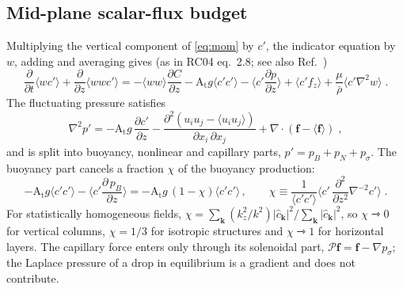 \documentclass[11pt]{article}
\numberwithin{equation}{section}
\newcommand{\avg}[1]{\langle #1\rangle}
\newcommand{\At}{\mathrm{A_t}}
\newcommand{\pd}[2]{\frac{\partial #1}{\partial #2}}
\begin{document}
\subsection{Mid-plane scalar-flux budget}\label{sec:rc:flux}
Multiplying the vertical component of \eqref{eq:mom} by $c'$, the indicator equation by $w$, adding and averaging gives (as in RC04 eq.~2.8; see also Ref.~\cite{Pope_book})
\begin{equation}\label{eq:flux_eq}
\pd{}{t} \avg{w c'} + \pd{}{z} \avg{w w c'} = -\avg{w w} \pd{C}{z} - \At g \avg{c' c'} - \Big\langle c' \pd{p}{z}\Big\rangle
+ \avg{c' f_z} + \frac{\mu}{\bar\rho} \avg{c' \nabla^2 w} \;.
\end{equation}
The fluctuating pressure satisfies
\begin{equation}\label{eq:poisson}
\nabla^2 p' = -\At g \, \pd{c'}{z} - \frac{\partial^2(u_i u_j - \avg{u_i u_j})}{\partial x_i \, \partial x_j}
+ \nabla \cdot (\mathbf f - \avg{\mathbf f}) \;,
\end{equation}
and is split into buoyancy, nonlinear and capillary parts, $p' = p_B + p_N + p_\sigma$. The buoyancy part cancels a fraction $\chi$ of the buoyancy production:
\begin{equation}\label{eq:chi}
- \At g \avg{c' c'} - \Big\langle c' \pd{\, p_B}{z}\Big\rangle = -\At g \,(1 - \chi) \avg{c' c'} \, , \qquad
\chi \equiv \frac{1}{\avg{c' c'}} \Big\langle c' \, \frac{\partial^2}{\partial z^2} \nabla^{-2} c'\Big\rangle \;.
\end{equation}
For statistically homogeneous fields, $\chi = \sum_{\mathbf k}(k_z^2/k^2) | \hat c_{\mathbf k} |^2/\sum_{\mathbf k} | \hat c_{\mathbf k} |^2$, so $\chi \rightarrowtriangle 0$ for vertical columns, $\chi = 1/3$ for isotropic structures and $\chi \rightarrowtriangle 1$ for horizontal layers. The capillary force enters only through its solenoidal part, $\mathcal P \mathbf f = \mathbf f - \nabla p_\sigma$; the Laplace pressure of a drop in equilibrium is a gradient and does not contribute.
\end{document}

